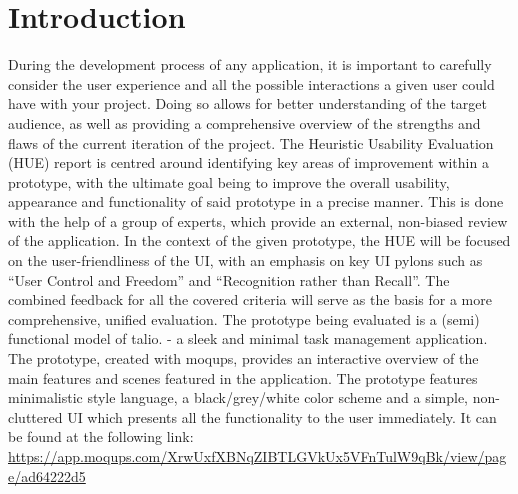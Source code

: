 \section{Introduction}\label{sec:introduction}

During the development process of any application, it is important to carefully consider the user experience and all the possible interactions a given user could have with your project.
Doing so allows for better understanding of the target audience, as well as providing a comprehensive overview of the strengths and flaws of the current iteration of the project.
The Heuristic Usability Evaluation (HUE) report is centred around identifying key areas of improvement within a prototype, with the ultimate goal being to improve the overall usability, appearance and functionality of said prototype in a precise manner.
This is done with the help of a group of experts, which provide an external, non-biased review of the application.
In the context of the given prototype, the HUE will be focused on the user-friendliness of the UI, with an emphasis on key UI pylons such as ``User Control and Freedom'' and ``Recognition rather than Recall''.
The combined feedback for all the covered criteria will serve as the basis for a more comprehensive, unified evaluation.
The prototype being evaluated is a (semi) functional model of talio.
- a sleek and minimal task management application.
The prototype, created with moqups, provides an interactive overview of the main features and scenes featured in the application.
The prototype features minimalistic style language, a black/grey/white color scheme and a simple, non-cluttered UI which presents all the functionality to the user immediately.
It can be found at the following link: \url{https://app.moqups.com/XrwUxfXBNqZIBTLGVkUx5VFnTulW9qBk/view/page/ad64222d5}

